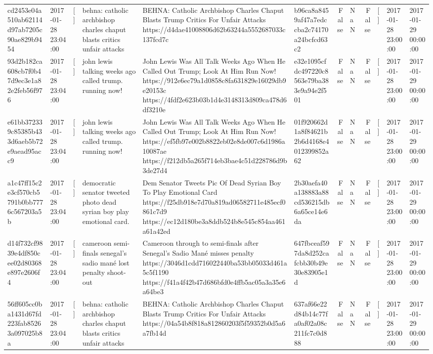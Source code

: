 \begin{tabular}{llllllrlrlll}
cd2453e04a510ab62114d97ab7205c90ae829b9454 & 2017-01-28 23:04:00 & [] & behna: catholic archbishop charles chaput blasts critics unfair attacks & BEHNA: Catholic Archbishop Charles Chaput Blasts Trump Critics For Unfair Attacks https://d4dae41008806d62b63244a5552687033c137fcd7c & b96ca8a8459af47a7edccba2c74170a24bcfcd63c2 & False & NaN & False & [] & 2017-01-28 23:00:00 & 2017-01-29 00:00:00 \\
93d2b182ca608cb7f0b47d9ec3e1a82e2feb56f976 & 2017-01-28 23:04:00 & [] & john lewis talking weeks ago called trump. running now! & John Lewis Was All Talk Weeks Ago When He Called Out Trump; Look At Him Run Now! https://912e6ec79a1d0858c8fa631829e16029db9e20153c https://4fdf2e623b03b1d4e3148313d809ca478d6df3210e & e32e1095cfdc497220c8563e79ba383e9a94e2f501 & False & NaN & False & [] & 2017-01-28 23:00:00 & 2017-01-29 00:00:00 \\
e61bb372339c85385b433d6aeb5b72e9aead95acc9 & 2017-01-28 23:04:00 & [] & john lewis talking weeks ago called trump. running now! & John Lewis Was All Talk Weeks Ago When He Called Out Trump; Look At Him Run Now! https://ef5fb97e002b8822eb02e8de007c6d1986a10087ae https://f212db5a265f714eb3bae4c51d228786d9b3de27d4 & 01f920662d1a8f84621b2b6d4168e4012399852a62 & False & NaN & False & [] & 2017-01-28 23:00:00 & 2017-01-29 00:00:00 \\
a1c47ff15c2e3cf570cb5791b0bb7776c567203a5b & 2017-01-28 23:04:00 & [] & democratic senator tweeted photo dead syrian boy play emotional card. & Dem Senator Tweets Pic Of Dead Syrian Boy To Play Emotional Card https://f25db918e7d70a819ad06582711e485ecf0861c7d9 https://ec12d180be3a8ddb524b8e545c854aa461a61a42ed & 2b30aefa40a138883a88cd536215db6a65ce14e6da & False & NaN & False & [] & 2017-01-28 23:00:00 & 2017-01-29 00:00:00 \\
d14f732cf9839e4df850cee02d80368e897e2606f4 & 2017-01-28 23:04:00 & [] & cameroon semi-finals senegal's sadio mané lost penalty shoot-out & Cameroon through to semi-finals after Senegal’s Sadio Mané misses penalty https://3046d1cdd716022440ba53bb05033d461a5c5f1190 https://f41a4f42b47d686bfd0e4ffb5ac05a3a35e6a64be3 & 647fbceaf597da8d252cafcbb30b49e30e83905e1d & False & NaN & False & [] & 2017-01-28 23:00:00 & 2017-01-29 00:00:00 \\
56ff605cc0ba1431d67fd223fab85263a097025b8a & 2017-01-28 23:04:00 & [] & behna: catholic archbishop charles chaput blasts critics unfair attacks & BEHNA: Catholic Archbishop Charles Chaput Blasts Trump Critics For Unfair Attacks https://04a54b8f818a812860203f5f59352b0d5a6a7fb14d & 637af66e22d84b14c77fa0af02a08c211fc7c0d888 & False & NaN & False & [] & 2017-01-28 23:00:00 & 2017-01-29 00:00:00 \\

\end{tabular}
